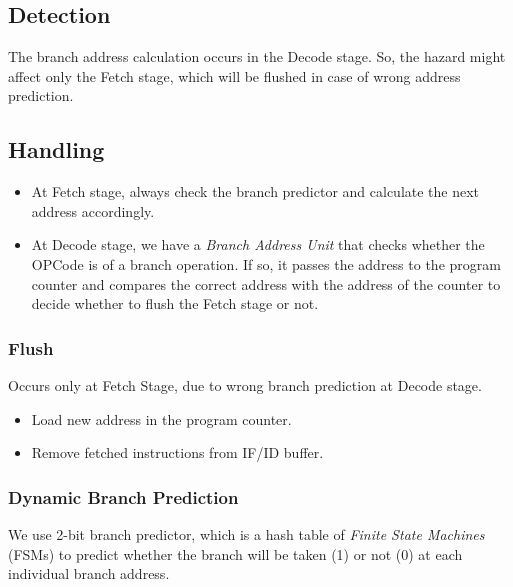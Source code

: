 \documentclass[12pt]{report}
\begin{document}
\subsection{Detection}
The branch address calculation occurs in the Decode stage. So, the hazard might affect only the Fetch stage, which will be flushed in case of wrong address prediction.

\subsection{Handling}
\begin{itemize}
    \item At Fetch stage, always check the branch predictor and calculate the next address accordingly.
    \item At Decode stage, we have a \emph{Branch Address Unit} that checks whether the OPCode is of a branch operation. If so, it passes the address to the program counter and compares the correct address with the address of the counter to decide whether to flush the Fetch stage or not. 
\end{itemize}

\subsubsection{Flush}
Occurs only at Fetch Stage, due to wrong branch prediction at Decode stage.
\begin{itemize}
    \item Load new address in the program counter.
    \item Remove fetched instructions from IF/ID buffer.
\end{itemize}

\subsubsection{Dynamic Branch Prediction}
We use 2-bit branch predictor, which is a hash table of \emph{Finite State Machines} (FSMs) to predict whether the branch will be taken (1) or not (0) at each individual branch address.
\end{document}
